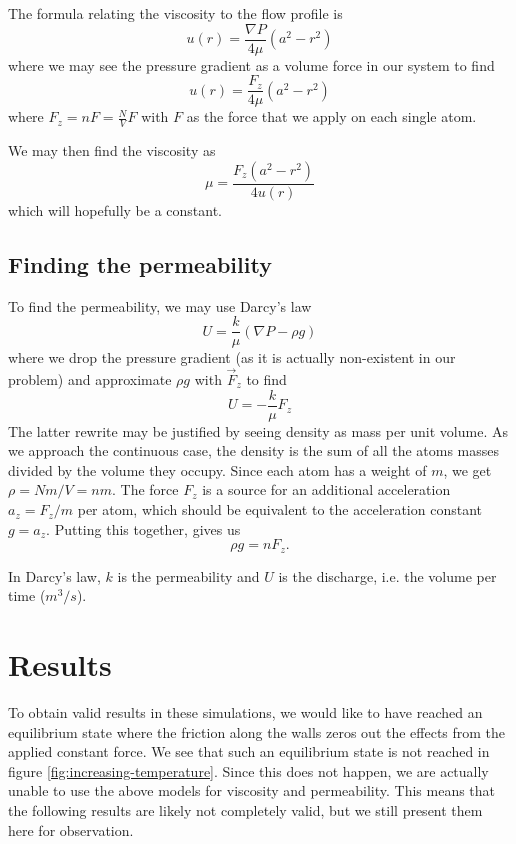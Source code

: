 \documentclass[reprint,floatfix,amsmath,amssymb,aps,pra]{revtex4-1}
\begin{document}
The formula relating the viscosity to the flow profile is
\begin{equation}
  u(r) = \frac{\nabla P}{4\mu} (a^2 - r^2)
\end{equation} 
where we may see the pressure gradient as a volume force in our system to find
\begin{equation}
  u(r) = \frac{F_z}{4\mu} (a^2 - r^2)
\end{equation}
where $F_{z} = n F = \frac{N}{V} F$ with $F$ as the force that we apply on each single atom.

We may then find the viscosity as
\begin{equation}
  \mu = \frac{F_{z}(a^2 - r^2)}{4 u(r)}
\end{equation}
which will hopefully be a constant.

\subsection{Finding the permeability}

To find the permeability, we may use Darcy's law
\begin{equation}
  U = \frac{k}{\mu} (\nabla P - \rho g)
\end{equation} 
%
where we drop the pressure gradient (as it is actually non-existent in our problem) and approximate $\rho g$ with $\vec F_z$ to find
%
\begin{equation}
  U = -\frac{k}{\mu} F_z
\end{equation} 
%
The latter rewrite may be justified by seeing density as mass per unit volume. As we approach the continuous case, the density is the sum of all the atoms masses divided by the volume they occupy. Since each atom has a weight of $m$, we get $\rho = Nm/V = nm$. The force $F_z$ is a source for an additional acceleration $a_z = F_z / m$ per atom, which should be equivalent to the acceleration constant $g = a_z$. Putting this together, gives us
\begin{equation}
  \rho g = nF_z.
\end{equation} 

In Darcy's law, $k$ is the permeability and $U$ is the discharge, i.e. the volume per time ($\unit{m^3/s}$).

\section{Results}

To obtain valid results in these simulations, we would like to have reached an equilibrium state where the friction along the walls zeros out the effects from the applied constant force. We see that such an equilibrium state is not reached in figure \ref{fig:increasing-temperature}. Since this does not happen, we are actually unable to use the above models for viscosity and permeability. This means that the following results are likely not completely valid, but we still present them here for observation.
\end{document}
